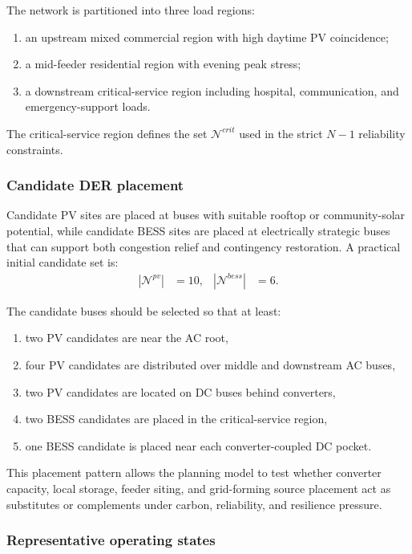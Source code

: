 The network is partitioned into three load regions:
\begin{enumerate}
  \item an upstream mixed commercial region with high daytime PV coincidence;
  \item a mid-feeder residential region with evening peak stress;
  \item a downstream critical-service region including hospital, communication, and emergency-support loads.
\end{enumerate}

The critical-service region defines the set \(\mathcal{N}^{crit}\) used in the strict \(N{-}1\) reliability constraints.

\subsubsection{Candidate DER placement}

Candidate PV sites are placed at buses with suitable rooftop or community-solar potential, while candidate BESS sites are placed at electrically strategic buses that can support both congestion relief and contingency restoration. A practical initial candidate set is:
\begin{align}
|\mathcal{N}^{pv}| &= 10,
&|\mathcal{N}^{bess}| &= 6.
\end{align}

The candidate buses should be selected so that at least:
\begin{enumerate}
  \item two PV candidates are near the AC root,
  \item four PV candidates are distributed over middle and downstream AC buses,
  \item two PV candidates are located on DC buses behind converters,
  \item two BESS candidates are placed in the critical-service region,
  \item one BESS candidate is placed near each converter-coupled DC pocket.
\end{enumerate}

This placement pattern allows the planning model to test whether converter capacity, local storage, feeder siting, and grid-forming source placement act as substitutes or complements under carbon, reliability, and resilience pressure.

\subsubsection{Representative operating states}

